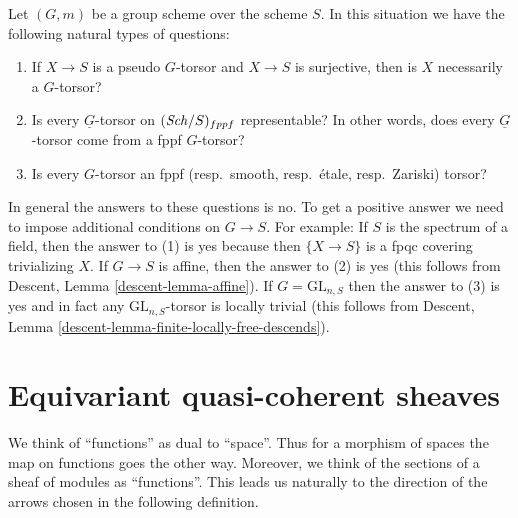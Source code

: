\begin{remark}
\label{remark-fun-with-torsors}
Let $(G, m)$ be a group scheme over the scheme $S$.
In this situation we have the following natural types of questions:
\begin{enumerate}
\item If $X \to S$ is a pseudo $G$-torsor and $X \to S$ is surjective,
then is $X$ necessarily a $G$-torsor?
\item Is every $\underline{G}$-torsor on $(\mathit{Sch}/S)_{fppf}$
representable? In other words, does every $\underline{G}$-torsor
come from a fppf $G$-torsor?
\item Is every $G$-torsor an
fppf (resp.\ smooth, resp.\ \'etale, resp.\ Zariski) torsor?
\end{enumerate}
In general the answers to these questions is no. To get a positive answer
we need to impose additional conditions on $G \to S$.
For example:
If $S$ is the spectrum of a field, then the answer to (1) is yes
because then $\{X \to S\}$ is a fpqc covering trivializing $X$.
If $G \to S$ is affine, then the answer to (2) is yes
(this follows from Descent, Lemma \ref{descent-lemma-affine}).
If $G = \text{GL}_{n, S}$ then the answer to (3) is yes
and in fact any $\text{GL}_{n, S}$-torsor is locally trivial
(this follows from
Descent, Lemma \ref{descent-lemma-finite-locally-free-descends}).
\end{remark}



\section{Equivariant quasi-coherent sheaves}
\label{section-equivariant}

\noindent
We think of ``functions'' as dual to ``space''. Thus for a morphism of spaces
the map on functions goes the other way. Moreover, we think of the
sections of a sheaf of modules as ``functions''. This leads us naturally
to the direction of the arrows chosen in the following definition.


